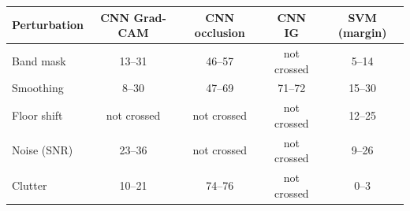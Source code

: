 \begin{tabular}{@{}lcccc@{}}\toprule
Perturbation & CNN Grad-CAM & CNN occlusion & CNN IG & SVM (margin)\\\midrule
Band mask & 13--31 & 46--57 & not crossed & 5--14 \\
Smoothing & 8--30 & 47--69 & 71--72 & 15--30 \\
Floor shift & not crossed & not crossed & not crossed & 12--25 \\
Noise (SNR) & 23--36 & not crossed & not crossed & 9--26 \\
Clutter & 10--21 & 74--76 & not crossed & 0--3 \\
\bottomrule\end{tabular}

